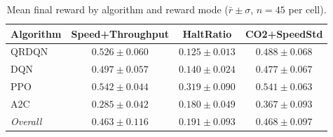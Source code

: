 \begin{table}[htbp]
\centering
\caption{Mean final reward by algorithm and reward mode ($\bar{r} \pm \sigma$, $n=45$ per cell).}
\label{tab:algo_reward}
\begin{tabular}{lccc}
\toprule
Algorithm & Speed+Throughput & HaltRatio & CO2+SpeedStd \\
\midrule
QRDQN & $0.526 \pm 0.060$ & $0.125 \pm 0.013$ & $0.488 \pm 0.068$ \\
DQN & $0.497 \pm 0.057$ & $0.140 \pm 0.024$ & $0.477 \pm 0.067$ \\
PPO & $0.542 \pm 0.044$ & $0.319 \pm 0.090$ & $0.541 \pm 0.063$ \\
A2C & $0.285 \pm 0.042$ & $0.180 \pm 0.049$ & $0.367 \pm 0.093$ \\
\midrule
\textit{Overall} & $0.463 \pm 0.116$ & $0.191 \pm 0.093$ & $0.468 \pm 0.097$ \\
\bottomrule
\end{tabular}
\end{table}